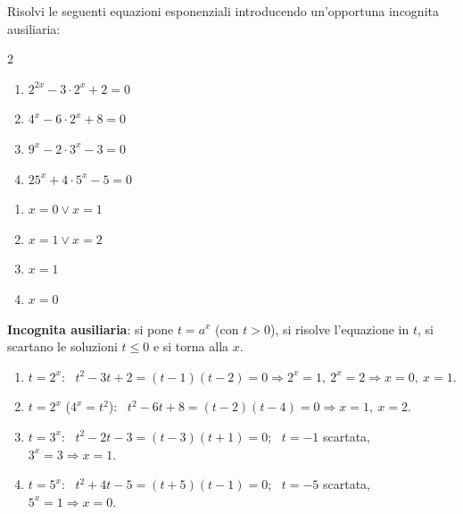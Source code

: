 \begin{question}[ID=3.7, subtitle={Equazioni con sostituzione: trinomi in $a^x$}, difficulty=media, tags={equazioni, esponenziali, sostituzione}]
Risolvi le seguenti equazioni esponenziali introducendo un'opportuna incognita ausiliaria:
\begin{center}\begin{minipage}{0.92\linewidth}
\begin{multicols}{2}
\begin{enumerate}[leftmargin=3.2cm]
\item $2^{2x} - 3 \cdot 2^{x} + 2 = 0$
\item $4^{x} - 6 \cdot 2^{x} + 8 = 0$
\item $9^{x} - 2 \cdot 3^{x} - 3 = 0$
\item $25^{x} + 4 \cdot 5^{x} - 5 = 0$
\end{enumerate}
\end{multicols}
\end{minipage}\end{center}
\begin{solution}
\begin{enumerate}
    \item $x=0\vee x=1$
    \item $x=1\vee x=2$
    \item $x=1$
    \item $x=0$
\end{enumerate}
\end{solution}
\begin{explanation}
\textbf{Incognita ausiliaria}: si pone $t=a^x$ (con $t>0$), si risolve l'equazione in $t$, si scartano le soluzioni $t\leq0$ e si torna alla $x$.
\begin{enumerate}
    \item $t=2^x$: \ $t^2-3t+2=(t-1)(t-2)=0 \Rightarrow 2^x=1,\ 2^x=2 \Rightarrow x=0,\ x=1$.
    \item $t=2^x$ ($4^x=t^2$): \ $t^2-6t+8=(t-2)(t-4)=0 \Rightarrow x=1,\ x=2$.
    \item $t=3^x$: \ $t^2-2t-3=(t-3)(t+1)=0$; \ $t=-1$ scartata, $3^x=3 \Rightarrow x=1$.
    \item $t=5^x$: \ $t^2+4t-5=(t+5)(t-1)=0$; \ $t=-5$ scartata, $5^x=1 \Rightarrow x=0$.
\end{enumerate}
\end{explanation}
\end{question}


